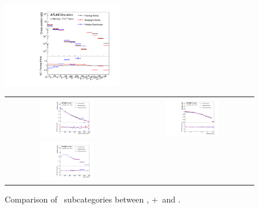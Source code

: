 \begin{figure}[p]
\begin{center}
\includegraphics[width=0.46\textwidth]{Modeling/Figures/default_realHFbb_extHFtype}
\caption{Comparison of \ttbb\ subcategories between \PP, \madgraph+\pythia\ and \ShOL.}
\label{fig:default_extHFtype_app}
\end{center}
\vspace{-20pt}
\begin{center}
\begin{tabular}{cc}
\includegraphics[width=0.46\textwidth]{Modeling/Figures/default_tt1bq_q1_pt_norm} &
\includegraphics[width=0.46\textwidth]{Modeling/Figures/default_tt1bq_q1_eta_norm} \\
\includegraphics[width=0.46\textwidth]{Modeling/Figures/default_tt1bq_top_pt_norm} &

\end{tabular}
\end{center}
\end{figure}
